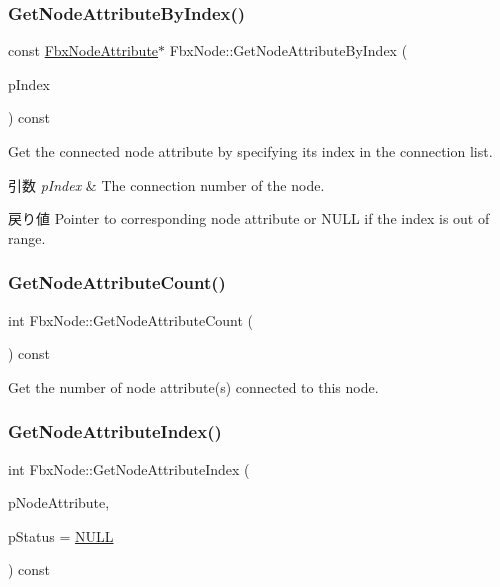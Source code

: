 \subsubsection{\texorpdfstring{Get\+Node\+Attribute\+By\+Index()}{GetNodeAttributeByIndex()}\hspace{0.1cm}{\footnotesize\ttfamily [2/2]}}
{\footnotesize\ttfamily const \hyperlink{class_fbx_node_attribute}{Fbx\+Node\+Attribute}$\ast$ Fbx\+Node\+::\+Get\+Node\+Attribute\+By\+Index (\begin{DoxyParamCaption}\item[{int}]{p\+Index }\end{DoxyParamCaption}) const}

Get the connected node attribute by specifying its index in the connection list. 
\begin{DoxyParams}{引数}
{\em p\+Index} & The connection number of the node. \\
\hline
\end{DoxyParams}
\begin{DoxyReturn}{戻り値}
Pointer to corresponding node attribute or {\ttfamily N\+U\+LL} if the index is out of range. 
\end{DoxyReturn}
\mbox{\label{class_fbx_node_a3d39e3db38ce79ab0d7196fe4388ec64}} 
\subsubsection{\texorpdfstring{Get\+Node\+Attribute\+Count()}{GetNodeAttributeCount()}}
{\footnotesize\ttfamily int Fbx\+Node\+::\+Get\+Node\+Attribute\+Count (\begin{DoxyParamCaption}{ }\end{DoxyParamCaption}) const}



Get the number of node attribute(s) connected to this node. 

\mbox{\label{class_fbx_node_a95b33d65d88ae6b759bb5ae680ba5454}} 
\subsubsection{\texorpdfstring{Get\+Node\+Attribute\+Index()}{GetNodeAttributeIndex()}}
{\footnotesize\ttfamily int Fbx\+Node\+::\+Get\+Node\+Attribute\+Index (\begin{DoxyParamCaption}\item[{\hyperlink{class_fbx_node_attribute}{Fbx\+Node\+Attribute} $\ast$}]{p\+Node\+Attribute,  }\item[{\hyperlink{class_fbx_status}{Fbx\+Status} $\ast$}]{p\+Status = {\ttfamily \hyperlink{fbxarch_8h_a070d2ce7b6bb7e5c05602aa8c308d0c4}{N\+U\+LL}} }\end{DoxyParamCaption}) const}

